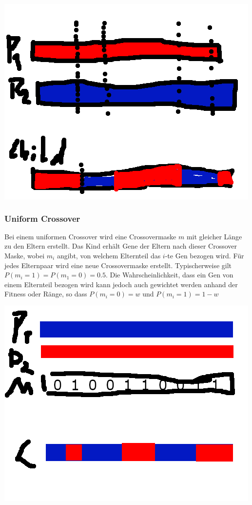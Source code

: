 \includegraphics[scale=1.0]{images/N_Point_Crossover.png}

\subsubsection*{Uniform Crossover}
Bei einem uniformen Crossover wird eine Crossovermaske $m$ mit gleicher Länge zu den Eltern erstellt.
Das Kind erhält Gene der Eltern nach dieser Crossover Maske, wobei
$m_i$ angibt, von welchem Elternteil das $i$-te Gen bezogen wird.
Für jedes Elternpaar wird eine neue Crossovermaske erstellt. 
Typischerweise gilt $P(m_i = 1) = P(m_1 = 0) = 0.5$. Die Wahrscheinlichkeit, dass
ein Gen von einem Elternteil bezogen wird kann jedoch auch gewichtet werden anhand 
der Fitness oder Ränge, so dass
$P(m_i = 0) = w$ und $P(m_i = 1) = 1 - w$

\includegraphics[scale=1.0]{images/Uniform_Crossover.png}

